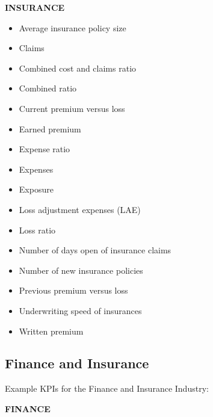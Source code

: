 \documentclass[]{book}
\providecommand{\tightlist}{%
  \setlength{\itemsep}{0pt}\setlength{\parskip}{0pt}}
\begin{document}
\textbf{INSURANCE }

\begin{itemize}
\tightlist
\item
  Average insurance policy size
\item
  Claims
\item
  Combined cost and claims ratio
\item
  Combined ratio
\item
  Current premium versus loss
\item
  Earned premium
\item
  Expense ratio
\item
  Expenses
\item
  Exposure
\item
  Loss adjustment expenses (LAE)
\item
  Loss ratio
\item
  Number of days open of insurance claims
\item
  Number of new insurance policies
\item
  Previous premium versus loss
\item
  Underwriting speed of insurances
\item
  Written premium
\end{itemize}

\subsection{Finance and Insurance}\label{finance-and-insurance}

Example KPIs for the Finance and Insurance Industry:

\textbf{FINANCE }
\end{document}
